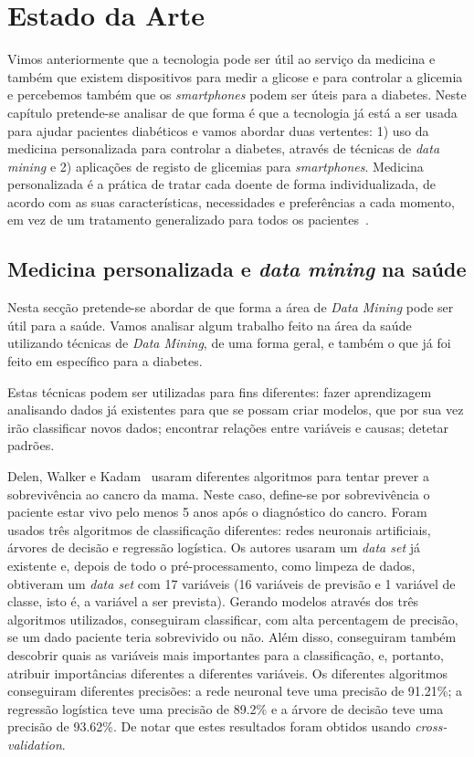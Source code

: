 \chapter{Estado da Arte}\label{chap:stat}

Vimos anteriormente que a tecnologia pode ser útil ao serviço da medicina e também que existem dispositivos para medir a glicose e para controlar a glicemia e percebemos também que os \textit{smartphones} podem ser úteis para a diabetes. Neste capítulo pretende-se analisar de que forma é que a tecnologia já está a ser usada para ajudar pacientes diabéticos e vamos abordar duas vertentes: 1) uso da medicina personalizada para controlar a diabetes, através de técnicas de \textit{data mining} e 2) aplicações de registo de glicemias para \textit{smartphones}.
Medicina personalizada é a prática de tratar cada doente de forma individualizada, de acordo com as suas características, necessidades e preferências a cada momento, em vez de um tratamento generalizado para todos os pacientes~\cite{personalized}.

\section{Medicina personalizada e \textit{data mining} na saúde}


Nesta secção pretende-se abordar de que forma a área de \textit{Data Mining} pode ser útil para a saúde. Vamos analisar algum trabalho feito na área da saúde utilizando técnicas de \textit{Data Mining}, de uma forma geral, e também o que já foi feito em específico para a diabetes. 

Estas técnicas podem ser utilizadas para fins diferentes: fazer aprendizagem analisando dados já existentes para que se possam criar modelos, que por sua vez irão classificar novos dados; encontrar relações entre variáveis e causas; detetar padrões.

Delen, Walker e Kadam~\cite{cancer} usaram diferentes algoritmos para tentar prever a sobrevivência ao cancro da mama. Neste caso, define-se por sobrevivência o paciente estar vivo pelo menos 5 anos após o diagnóstico do cancro. Foram usados três algoritmos de classificação diferentes: redes neuronais artificiais, árvores de decisão e regressão logística. Os autores usaram um \textit{data set} já existente e, depois de todo o pré-processamento, como limpeza de dados, obtiveram um \textit{data set} com 17 variáveis (16 variáveis de previsão e 1 variável de classe, isto é, a variável a ser prevista). Gerando modelos através dos três algoritmos utilizados, conseguiram classificar, com alta percentagem de precisão, se um dado paciente teria sobrevivido ou não. Além disso, conseguiram também descobrir quais as variáveis mais importantes para a classificação, e, portanto, atribuir importâncias diferentes a diferentes variáveis. Os diferentes algoritmos conseguiram diferentes precisões: a rede neuronal teve uma precisão de 91.21\%; a regressão logística teve uma precisão de 89.2\% e a árvore de decisão teve uma precisão de 93.62\%. De notar que estes resultados foram obtidos usando \textit{cross-validation}. 

